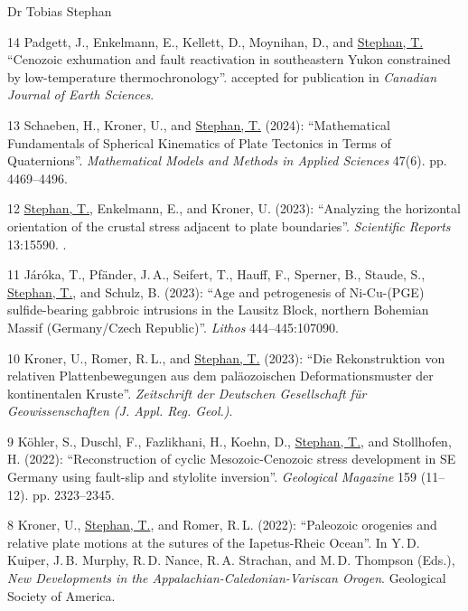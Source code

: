 \documentclass[10pt, paper=letter]{scrartcl} %
\begin{document}
\begin{cv}{\textsf{Dr Tobias Stephan}}
\begin{cvlist}{}
        \item[14] Padgett, J., Enkelmann, E., Kellett, D., Moynihan, D., and \ul{Stephan, T.} \enquote{Cenozoic exhumation and fault reactivation in southeastern Yukon constrained by low-temperature thermochronology}. accepted for publication in \textit{Canadian Journal of Earth Sciences}.
        
        \item[13] Schaeben, H., Kroner, U., and \ul{Stephan, T.} (2024): \enquote{Mathematical Fundamentals of Spherical Kinematics of Plate Tectonics in Terms of Quaternions}. \textit{Mathematical Models and Methods in Applied Sciences} 47(6). pp. 4469--4496. 

        \item[12] \ul{Stephan, T.}, Enkelmann, E., and Kroner, U. (2023): \enquote{Analyzing the horizontal orientation of the crustal stress adjacent to plate boundaries}. \textit{Scientific Reports} 13:15590. .
        \item[11] Járóka, T.,  Pfänder, J.\,A., Seifert, T., Hauff, F., Sperner, B., Staude, S., \ul{Stephan, T.}, and Schulz, B. (2023): \enquote{Age and petrogenesis of Ni-Cu-(PGE) sulfide-bearing gabbroic intrusions in the Lausitz Block, northern Bohemian Massif (Germany/Czech Republic)}. \textit{Lithos} 444--445:107090. 
        \item[10] Kroner, U., Romer, R.\,L., and \ul{Stephan, T.} (2023): \enquote{Die Rekonstruktion von relativen Plattenbewegungen aus dem paläozoischen Deformationsmuster der kontinentalen Kruste}. \textit{Zeitschrift der Deutschen Gesellschaft für Geowissenschaften (J. Appl. Reg. Geol.)}. 
        \item[9] K\"ohler, S., Duschl, F., Fazlikhani, H., Koehn, D., \ul{Stephan, T.}, and Stollhofen, H. (2022): \enquote{Reconstruction of cyclic Mesozoic-Cenozoic stress development in SE Germany using fault-slip and stylolite inversion}. \textit{Geological Magazine} 159 (11--12). pp. 2323--2345.\newline
        \item[8] Kroner, U., \ul{Stephan, T.}, and Romer, R.\,L. (2022): \enquote{Paleozoic orogenies and relative plate motions at the sutures of the Iapetus-Rheic Ocean}. In Y.\,D. Kuiper, J.\,B. Murphy, R.\,D. Nance, R.\,A. Strachan, and M.\,D. Thompson (Eds.), \textit{New Developments in the Appalachian-Caledonian-Variscan Orogen}. Geological Society of America. 

\end{cvlist}
\end{cv}
\end{document}
